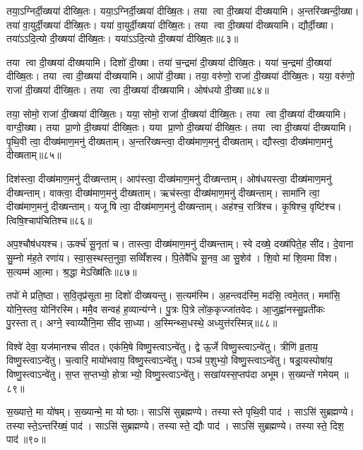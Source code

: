 तया॒ऽग्निर्दी॒ख्षया॑ दीख्षि॒तः। यया॒ऽग्निर्दी॒ख्षया॑ दीख्षि॒तः। तया त्वा दी॒ख्षया॑ दीख्षयामि। अ॒न्तरि॑ख्षन्दी॒ख्षा। तया॑ वा॒युर्दी॒ख्षया॑ दीख्षि॒तः। यया॑ वा॒युर्दी॒ख्षया॑ दीख्षि॒तः। तया त्वा दी॒ख्षया॑ दीख्षयामि। द्यौर्दी॒ख्षा। तया॑ऽऽदि॒त्यो दी॒ख्षया॑ दीख्षि॒तः। यया॑ऽऽदि॒त्यो दी॒ख्षया॑ दीख्षि॒तः॥८३॥

तया त्वा दी॒ख्षया॑ दीख्षयामि। दिशो॑ दी॒ख्षा। तया॑ च॒न्द्रमा॑ दी॒ख्षया॑ दीख्षि॒तः। यया॑ च॒न्द्रमा॑ दी॒ख्षया॑ दीख्षि॒तः। तया त्वा दी॒ख्षया॑ दीख्षयामि। आपो॑ दी॒ख्षा। तया॒ वरु॑णो॒ राजा॑ दी॒ख्षया॑ दीख्षि॒तः। यया॒ वरु॑णो॒ राजा॑ दी॒ख्षया॑ दीख्षि॒तः। तया त्वा दी॒ख्षया॑ दीख्षयामि। ओष॑धयो दी॒ख्षा॥८४॥

तया॒ सोमो॒ राजा॑ दी॒ख्षया॑ दीख्षि॒तः। यया॒ सोमो॒ राजा॑ दी॒ख्षया॑ दीख्षि॒तः। तया त्वा दी॒ख्षया॑ दीख्षयामि। वाग्दी॒ख्षा। तया प्रा॒णो दी॒ख्षया॑ दीख्षि॒तः। यया प्रा॒णो दी॒ख्षया॑ दीख्षि॒तः। तया त्वा दी॒ख्षया॑ दीख्षयामि। पृ॒थि॒वी त्वा॒ दीख्ष॑माण॒मनु॑ दीख्षताम्। अ॒न्तरि॑ख्षन्त्वा॒ दीख्ष॑माण॒मनु॑ दीख्षताम्। द्यौस्त्वा॒ दीख्ष॑माण॒मनु॑ दीख्षताम्॥८५॥

दिश॑स्त्वा॒ दीख्ष॑माण॒मनु॑ दीख्षन्ताम्। आप॑स्त्वा॒ दीख्ष॑माण॒मनु॑ दीख्षन्ताम्। ओष॑धयस्त्वा॒ दीख्ष॑माण॒मनु॑ दीख्षन्ताम्। वाक्त्वा॒ दीख्ष॑माण॒मनु॑ दीख्षताम्। ऋच॑स्त्वा॒ दीख्ष॑माण॒मनु॑ दीख्षन्ताम्। सामा॑नि त्वा॒ दीख्ष॑माण॒मनु॑ दीख्षन्ताम्। यजूषि त्वा॒ दीख्ष॑माण॒मनु॑ दीख्षन्ताम्। अह॑श्च॒ रात्रि॑श्च। कृ॒षिश्च॒ वृष्टि॑श्च। त्विषि॒श्चाप॑चितिश्च॥८६॥

अप॒श्चौष॑धयश्च। ऊर्क्च॑ सू॒नृता॑ च। तास्त्वा॒ दीख्ष॑माण॒मनु॑ दीख्षन्ताम्। स्वे दख्षे॒ दख्ष॑पिते॒ह सी॑द। दे॒वाना सु॒म्नो म॑ह॒ते रणा॑य। स्वा॒स॒स्थस्त॒नुवा॒ सव्विँ॑शस्व। पि॒तेवै॑धि सू॒नव॒ आ सु॒शेव॑। शि॒वो मा॑ शि॒वमा वि॑श। स॒त्यम्म॑ आ॒त्मा। श्र॒द्धा मेऽख्षि॑तिः॥८७॥

तपो॑ मे प्रति॒ष्ठा। स॒वि॒तृप्र॑सूता मा॒ दिशो॑ दीख्षयन्तु। स॒त्यम॑स्मि। अ॒हन्त्वद॑स्मि॒ मद॑सि॒ त्वमे॒तत्। ममा॑सि॒ योनि॒स्तव॒ योनि॑रस्मि। ममै॒व सन्वह॑ ह॒व्यान्य॑ग्ने। पु॒त्रः पि॒त्रे लो॑क॒कृज्जा॑तवेदः। आ॒जुह्वा॑नस्सु॒प्रती॑कः पु॒रस्तात्। अग्ने॒ स्वाय्योँनि॒मा सी॑द सा॒ध्या। अ॒स्मिन्थ्स॒धस्थे॒ अध्युत्त॑रस्मिन्न्॥८८॥

विश्वे॑ देवा॒ यज॑मानश्च सीदत। एक॑मि॒षे विष्णु॒स्त्वाऽन्वे॑तु। द्वे ऊ॒र्जे विष्णु॒स्त्वाऽन्वे॑तु। त्रीणि॑ व्र॒ताय॒ विष्णु॒स्त्वाऽन्वे॑तु। च॒त्वारि॒ मायो॑भवाय॒ विष्णु॒स्त्वाऽन्वे॑तु। पञ्च॑ प॒शुभ्यो॒ विष्णु॒स्त्वाऽन्वे॑तु। षड्रा॒यस्पोषा॑य॒ विष्णु॒स्त्वाऽन्वे॑तु। स॒प्त स॒प्तभ्यो॒ होत्राभ्यो॒ विष्णु॒स्त्वाऽन्वे॑तु। सखा॑यस्स॒प्तप॑दा अभूम। स॒ख्यन्ते॑ गमेयम् ॥८९॥

स॒ख्यात्ते॒ मा यो॑षम्। स॒ख्यान्मे॒ मा योष्ठाः। साऽसि॑ सुब्रह्मण्ये। तस्यास्ते पृथि॒वी पाद॑। साऽसि॑ सुब्रह्मण्ये। तस्यास्ते॒ऽन्तरि॑ख्षं॒ पाद॑। साऽसि॑ सुब्रह्मण्ये। तस्यास्ते॒ द्यौः पाद॑। साऽसि॑ सुब्रह्मण्ये। तस्यास्ते॒ दिश॒ पाद॑॥९०॥

